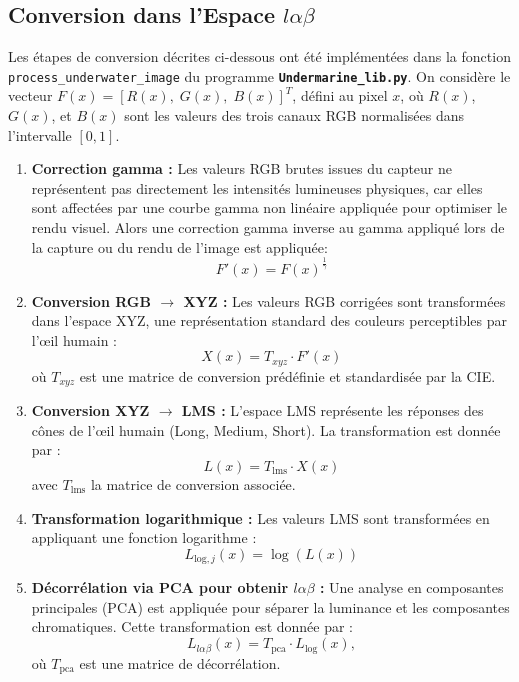 \documentclass[10pt, a4paper]{extarticle}
\numberwithin{equation}{section}
\numberwithin{figure}{section}
\begin{document}
\subsection{Conversion dans l'Espace $l\alpha\beta$}

\par Les étapes de conversion décrites ci-dessous ont été implémentées dans la fonction \colorbox{gray!15}{\texttt{process\_underwater\_image}} du programme \colorbox{gray!15}{\texttt{\textbf{Undermarine\_lib.py}}}. On considère le vecteur \( F(x) = \left[ R(x), \;  G(x), \; B(x) \right]^T \), défini au pixel \( x \), où \( R(x) \), \( G(x) \), et \( B(x) \) sont les valeurs des trois canaux RGB normalisées dans l'intervalle \([0, 1]\).
\vspace{3mm}
\begin{enumerate}
    \item \textbf{Correction gamma :} Les valeurs RGB brutes issues du capteur ne représentent pas directement les intensités lumineuses physiques, car elles sont affectées par une courbe gamma non linéaire appliquée pour optimiser le rendu visuel. Alors une correction gamma inverse au gamma appliqué lors de la capture ou du rendu de l'image est appliquée:
\[
F'(x) = F(x)^{\frac{1}{\gamma}}
\]

    \item \textbf{Conversion RGB \(\to\) XYZ :}  
    Les valeurs RGB corrigées sont transformées dans l'espace XYZ, une représentation standard des couleurs perceptibles par l'œil humain :
    \[
    X(x) = T_{xyz} \cdot F'(x)
    \]
    où \( T_{xyz} \) est une matrice de conversion prédéfinie et standardisée par la CIE.

    \item \textbf{Conversion XYZ \(\to\) LMS :}  
    L'espace LMS représente les réponses des cônes de l'œil humain (Long, Medium, Short). La transformation est donnée par :
    \[
    L(x) = T_{\text{lms}} \cdot X(x)
    \]
    avec $T_{\text{lms}}$ la matrice de conversion associée.

    \item \textbf{Transformation logarithmique :}  
    Les valeurs LMS sont transformées en appliquant une fonction logarithme :
    \[
    L_{\text{log}, j}(x) = \log\left(L(x)\right)
    \]

    \item \textbf{Décorrélation via PCA pour obtenir \( l\alpha\beta \) :}  
    Une analyse en composantes principales (PCA) est appliquée pour séparer la luminance et les composantes chromatiques. Cette transformation est donnée par :
    \[
    L_{l\alpha\beta}(x) = T_{\text{pca}} \cdot L_{\text{log}}(x),
    \]
    où \( T_{\text{pca}} \) est une matrice de décorrélation. 

\end{enumerate}
\end{document}
